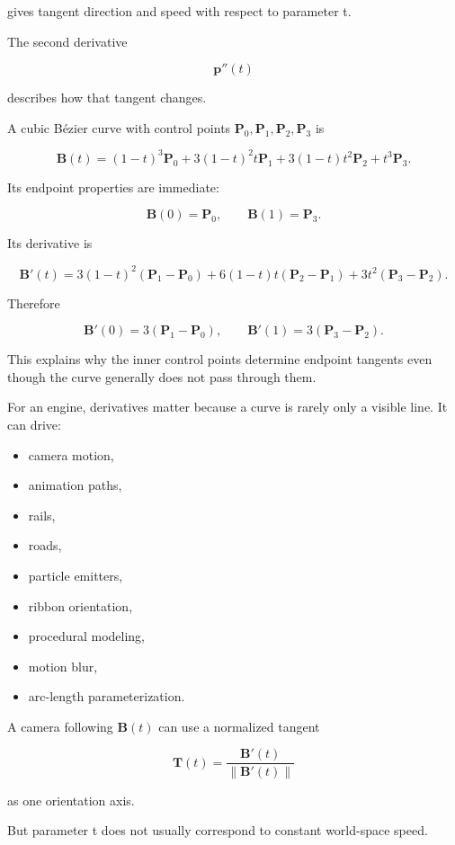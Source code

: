 gives tangent direction and speed with respect to parameter t.

The second derivative

\[
\mathbf p''(t)
\]

describes how that tangent changes.

A cubic Bézier curve with control points \(\mathbf P_0,\mathbf P_1,\mathbf P_2,\mathbf P_3\) is

\[
\mathbf B(t)
=
(1-t)^3\mathbf P_0
+
3(1-t)^2t\mathbf P_1
+
3(1-t)t^2\mathbf P_2
+
t^3\mathbf P_3.
\]

Its endpoint properties are immediate:

\[
\mathbf B(0)=\mathbf P_0,
\qquad
\mathbf B(1)=\mathbf P_3.
\]

Its derivative is

\[
\mathbf B'(t)
=
3(1-t)^2(\mathbf P_1-\mathbf P_0)
+
6(1-t)t(\mathbf P_2-\mathbf P_1)
+
3t^2(\mathbf P_3-\mathbf P_2).
\]

Therefore

\[
\mathbf B'(0)=3(\mathbf P_1-\mathbf P_0),
\qquad
\mathbf B'(1)=3(\mathbf P_3-\mathbf P_2).
\]

This explains why the inner control points determine endpoint tangents even though the curve generally does not pass through them.

For an engine, derivatives matter because a curve is rarely only a visible line. It can drive:

\begin{itemize}
\tightlist
\item
  camera motion,
\item
  animation paths,
\item
  rails,
\item
  roads,
\item
  particle emitters,
\item
  ribbon orientation,
\item
  procedural modeling,
\item
  motion blur,
\item
  arc-length parameterization.
\end{itemize}

A camera following \(\mathbf B(t)\) can use a normalized tangent

\[
\mathbf T(t)=
\frac{\mathbf B'(t)}
{\|\mathbf B'(t)\|}
\]

as one orientation axis.

But parameter t does not usually correspond to constant world-space speed.

